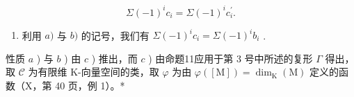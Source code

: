 \[
\Sigma (- 1) ^ {i} c _ {i} = \Sigma (- 1) ^ {i} c _ {i} ^ {\prime}.
\]

\begin{enumerate}
\def\labelenumi{\alph{enumi})}
\setcounter{enumi}{2}
\tightlist
\item
  利用 \(a)\) 与 \(b)\) 的记号，我们有 \(\Sigma(-1)^{i} c_{i} = \Sigma(-1)^{i} b_{i}\) .
\end{enumerate}

性质 \(a\) ) 与 \(b\) ) 由 \(c\) ) 推出，而 \(c\) ) 由命题11应用于第 3 号中所述的复形 \(\Gamma\) 得出，取 \(\mathscr{C}\) 为有限维 K-向量空间的类，取 \(\varphi\) 为由 \(\varphi([\mathrm{M}]) = \dim_{\mathrm{K}}(\mathrm{M})\) 定义的函数（X，第 40 页，例 1）。*

